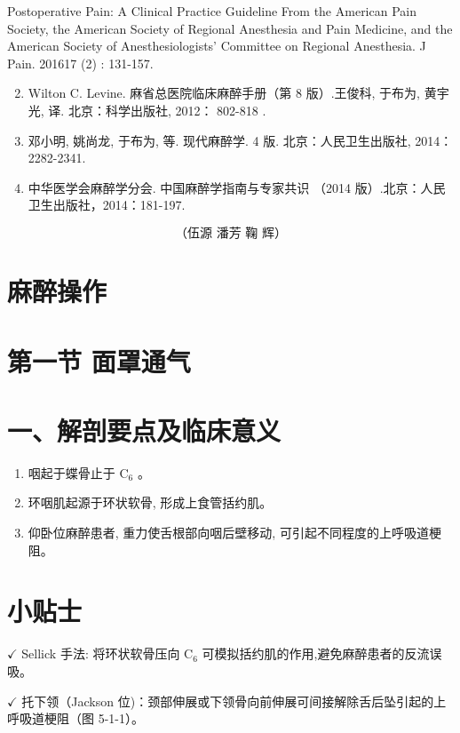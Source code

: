 \documentclass[10pt]{article}
\begin{document}
Postoperative Pain: A Clinical Practice Guideline From the American Pain Society, the American Society of Regional Anesthesia and Pain Medicine, and the American Society of Anesthesiologists' Committee on Regional Anesthesia. J Pain. 201617 (2) : 131-157.

\begin{enumerate}
  \setcounter{enumi}{1}
  \item Wilton C. Levine. 麻省总医院临床麻醉手册（第 8 版）.王俊科, 于布为, 黄宇光, 译. 北京：科学出版社, 2012： 802-818 .

  \item 邓小明, 姚尚龙, 于布为, 等. 现代麻醉学. 4 版. 北京：人民卫生出版社, 2014：2282-2341.

  \item 中华医学会麻醉学分会. 中国麻醉学指南与专家共识 （2014 版）.北京：人民卫生出版社，2014：181-197.

\end{enumerate}

\[
\text { （伍源 潘芳 鞠 辉） }
\]

\section*{麻醉操作}
\section*{第一节 面罩通气}
\section*{一、解剖要点及临床意义}
\begin{enumerate}
  \item 咽起于蝶骨止于 $\mathrm{C}_{6}$ 。

  \item 环咽肌起源于环状软骨, 形成上食管括约肌。

  \item 仰卧位麻醉患者, 重力使舌根部向咽后壁移动, 可引起不同程度的上呼吸道梗阻。

\end{enumerate}

\section*{小贴士}
$\checkmark$ Sellick 手法: 将环状软骨压向 $\mathrm{C}_{6}$ 可模拟括约肌的作用,避免麻醉患者的反流误吸。

$\checkmark$ 托下领（Jackson 位)：颈部伸展或下领骨向前伸展可间接解除舌后坠引起的上呼吸道梗阻（图 5-1-1）。
\end{document}
